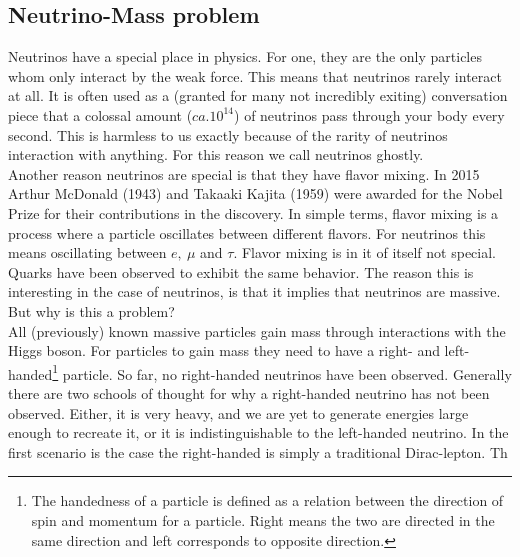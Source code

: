 \subsection{Neutrino-Mass problem}
Neutrinos have a special place in physics. For one, they are the only particles whom
only interact by the weak force. This means that neutrinos rarely interact at all. It is often used
as a (granted for many not incredibly exiting) conversation piece that a colossal amount ($ca.10^{14}$) of 
neutrinos pass through your body every second. This is harmless to us exactly because of the rarity
of neutrinos interaction with anything. For this reason we call neutrinos ghostly. 
\\
Another reason neutrinos are special is that they have flavor mixing. In 2015 Arthur McDonald (1943) and 
Takaaki Kajita (1959) were awarded for the Nobel Prize for their contributions in the discovery. In simple terms,
flavor mixing is a process where a particle oscillates between different flavors. For neutrinos this 
means oscillating between $e,\ \mu$ and $\tau$. Flavor mixing is in it of itself not special.
Quarks have been observed to exhibit the same behavior. The reason this is interesting in the case of 
neutrinos, is that it implies that neutrinos are massive. But why is this a problem?
\\
All (previously) known massive particles gain mass through interactions with the Higgs boson. For particles
to gain mass they need to have a right- and left-handed\footnote{The handedness of a particle is defined
as a relation between the direction of spin and momentum for a particle. Right means the two are directed
in the same direction and left corresponds to opposite direction.} particle. So far, no right-handed neutrinos
have been observed. Generally there are two schools of thought for why a right-handed neutrino has not been 
observed. Either, it is very heavy, and we are yet to generate energies large enough to recreate it, or 
it is indistinguishable to the left-handed neutrino. In the first scenario 
is the case the right-handed is simply a traditional Dirac-lepton. Th